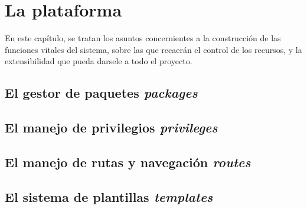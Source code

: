 \chapter{La plataforma}

En este capítulo, se tratan los asuntos concernientes a la construcción de las funciones vitales del sistema, sobre las que
recaerán el control de los recursos, y la extensibilidad que pueda darsele a todo el proyecto.

\section{El gestor de paquetes \emph{packages}}


\section{El manejo de privilegios \emph{privileges}}
\section{El manejo de rutas y navegación \emph{routes}}

\section{El sistema de plantillas \emph{templates}}

